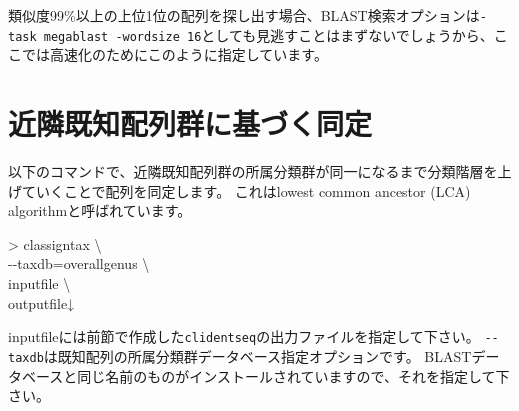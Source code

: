 \documentclass[titlepage,10pt,a4paper,english]{jsbook}
\newenvironment{cmd}{\begin{oframed}\raggedright\ttfamily\footnotesize\setlength{\baselineskip}{1.4em}}{\end{oframed}\vspace{-1em}}
\begin{document}
類似度99\%以上の上位1位の配列を探し出す場合、BLAST検索オプションは\texttt{-task megablast -word{\textunderscore}size 16}としても見逃すことはまずないでしょうから、ここでは高速化のためにこのように指定しています。

\section{近隣既知配列群に基づく同定}

以下のコマンドで、近隣既知配列群の所属分類群が同一になるまで分類階層を上げていくことで配列を同定します。
これはlowest common ancestor (LCA) algorithmと呼ばれています\citep{Huson2007}。
\begin{cmd}
{\textgreater} classigntax {\textbackslash}\\
{-}{-}taxdb=overall{\textunderscore}genus {\textbackslash}\\
inputfile {\textbackslash}\\
outputfile↓
\end{cmd}
inputfileには前節で作成した\texttt{clidentseq}の出力ファイルを指定して下さい。
\texttt{{-}{-}taxdb}は既知配列の所属分類群データベース指定オプションです。
BLASTデータベースと同じ名前のものがインストールされていますので、それを指定して下さい。
\end{document}

